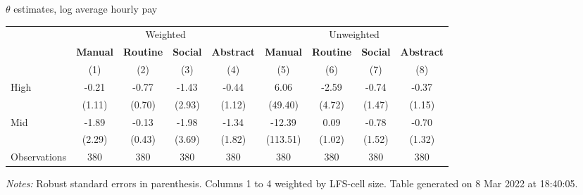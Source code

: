 \begin{center}
\begin{threeparttable}[!h]
\caption{$ \theta $ estimates, log average hourly pay}
\begin{tabular}{lcccccccc}
\toprule
\toprule
& \multicolumn{4}{c}{Weighted} & \multicolumn{4}{c}{Unweighted} \\
&\multicolumn{1}{c}{\textbf{Manual}}&\multicolumn{1}{c}{\textbf{Routine}}&\multicolumn{1}{c}{\textbf{Social}}&\multicolumn{1}{c}{\textbf{Abstract}}&\multicolumn{1}{c}{\textbf{Manual}}&\multicolumn{1}{c}{\textbf{Routine}}&\multicolumn{1}{c}{\textbf{Social}}&\multicolumn{1}{c}{\textbf{Abstract}} \\
\textbf{}&\multicolumn{1}{c}{(1)}&\multicolumn{1}{c}{(2)}&\multicolumn{1}{c}{(3)}&\multicolumn{1}{c}{(4)}&\multicolumn{1}{c}{(5)}&\multicolumn{1}{c}{(6)}&\multicolumn{1}{c}{(7)}&\multicolumn{1}{c}{(8)} \\
\midrule
High                &       -0.21&       -0.77&       -1.43&       -0.44&        6.06&       -2.59&       -0.74&       -0.37\\
                    &      (1.11)&      (0.70)&      (2.93)&      (1.12)&     (49.40)&      (4.72)&      (1.47)&      (1.15)\\
Mid                 &       -1.89&       -0.13&       -1.98&       -1.34&      -12.39&        0.09&       -0.78&       -0.70\\
                    &      (2.29)&      (0.43)&      (3.69)&      (1.82)&    (113.51)&      (1.02)&      (1.52)&      (1.32)\\
Observations        &         380&         380&         380&         380&         380&         380&         380&         380\\
\bottomrule
\bottomrule
\end{tabular}
\begin{tablenotes}
\item \footnotesize \textit{Notes:} Robust standard errors in parenthesis. Columns 1 to 4 weighted by LFS-cell size. Table generated on  8 Mar 2022 at 18:40:05.
\end{tablenotes}
\end{threeparttable}
\end{center}
